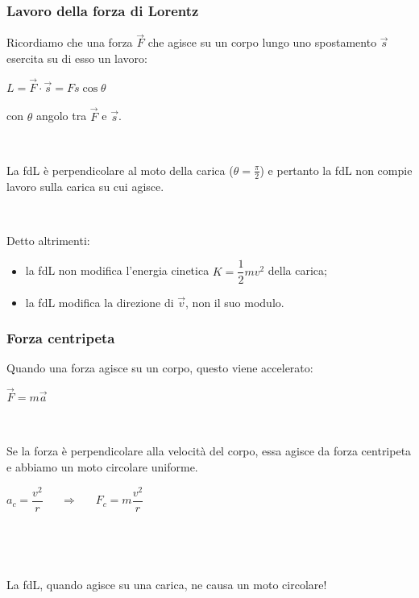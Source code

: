 \documentclass[]{beamer}
\theoremstyle{plain}
\begin{document}
\begin{frame}
\frametitle{Lavoro della forza di Lorentz}
Ricordiamo che una forza $ \vec{F} $ che agisce su un corpo lungo uno spostamento $ \vec{s} $ esercita su di esso un lavoro:
\begin{center}
$ L = \vec{F} \cdot \vec{s} = Fs\cos\theta$ 
\end{center}
con $ \theta $ angolo tra $ \vec{F} $ e $ \vec{s} $.\pause

~

La fdL è perpendicolare al moto della carica ($ \theta = \frac{\pi}{2} $) e pertanto \alert<2->{la fdL non compie lavoro sulla carica su cui agisce}.\pause

~

Detto altrimenti:
\begin{itemize}
  \item la fdL non modifica l'energia cinetica $ K = \dfrac{1}{2}mv^2 $ della carica;\pause
  \item la fdL \alert<4->{modifica la direzione di $ \vec{v} $, non il suo modulo}.
\end{itemize}
\end{frame}

\begin{frame}
\frametitle{Forza centripeta}
Quando una forza agisce su un corpo, questo viene accelerato: 
\begin{center}
$ \vec{F} = m\vec{a} $
\end{center}\pause

~

Se la forza è perpendicolare alla velocità del corpo, essa agisce da forza centripeta e abbiamo un \alert<2>{moto circolare uniforme}.
\begin{center}
$ a_c = \dfrac{v^2}{r} ~~~~~~~\Longrightarrow~~~~~~~ F_c = m \dfrac{v^2}{r} $

~

\href{gif/centripeta.gif}{}
\end{center}\pause

~

\alert<3>{La fdL, quando agisce su una carica, ne causa un moto circolare!}
\begin{center}
\href{video/Motomagnetico.mp4}{}
\end{center}
\end{frame}
\end{document}

